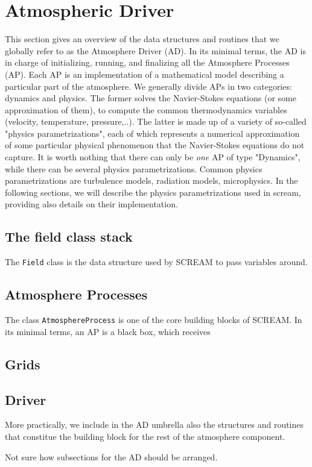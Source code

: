 \section{Atmospheric Driver}

This section gives an overview of the data structures and routines that we globally refer to as the Atmosphere Driver (AD).
In its minimal terms, the AD is in charge of initializing, running, and finalizing all the Atmosphere Processes (AP).
Each AP is an implementation of a mathematical model describing a particular part of the atmosphere.
We generally divide APs in two categories: dynamics and physics.
The former solves the Navier-Stokes equations (or some approximation of them),
to compute the common thermodynamics variables (velocity, temperature, pressure,..).
The latter is made up of a variety of so-called "physics parametrizations",
each of which represents a numerical approximation of some particular physical phenomenon
that the Navier-Stokes equations do not capture.
It is worth nothing that there can only be \emph{one} AP of type "Dynamics",
while there can be several physics parametrizations.
Common physics parametrizations are turbulence models, radiation models, microphysics.
In the following sections, we will describe the physics parametrizations used in scream,
providing also details on their implementation.

\subsection{The field class stack}
The \texttt{Field} class is the data structure used by SCREAM to pass variables around.


\subsection{Atmosphere Processes}
The class \texttt{AtmosphereProcess} is one of the core building blocks of SCREAM.
In its minimal terms, an AP is a black box, which receives



\subsection{Grids}

\subsection{Driver}


More practically, we include in the AD umbrella also the structures and routines that constitue the building block for the rest of the atmosphere component.

Not sure how subsections for the AD should be arranged.

